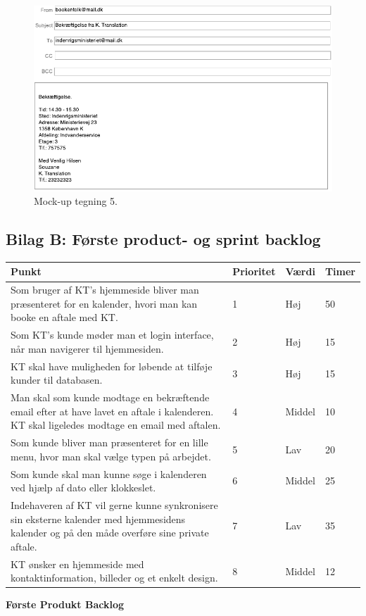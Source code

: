 \documentclass[12pt]{article}   %
\begin{document}
\newpage

\begin{figure}[!ht]
\begin{center}
\includegraphics{mock5.pdf}
\caption{Mock-up tegning 5.}
\end{center}
\end{figure}

\newpage

\subsection{Bilag B: Første product- og sprint backlog}

\begin{center}
	\begin{tabular}{|p{8cm}|l|l|l|}
		\hline
Punkt & Prioritet & Værdi & Timer \\ \hline
Som bruger af KT's hjemmeside bliver man præsenteret for en kalender, hvori man
kan booke en aftale med KT. & 1 & Høj &  50 \\ \hline
Som KT's kunde møder man et login interface, når man navigerer til hjemmesiden. & 2 &
Høj & 15  \\ \hline
KT skal have muligheden for løbende at tilføje kunder til databasen. & 3 & Høj
& 15 \\ \hline
Man skal som kunde modtage en bekræftende email efter at have lavet en aftale
i kalenderen. KT skal ligeledes modtage en email med aftalen. & 4 & Middel & 10  \\ \hline
Som kunde bliver man præsenteret for en lille menu, hvor man skal vælge typen
på arbejdet. & 5 & Lav & 20\\ \hline
Som kunde skal man kunne søge i kalenderen ved hjælp af dato eller klokkeslet.
& 6  & Middel &  25 \\ \hline
Indehaveren af KT vil gerne kunne synkronisere sin eksterne kalender med
hjemmesidens kalender og på den måde overføre sine private aftale. & 7 & Lav &
 35 \\ \hline
KT ønsker en hjemmeside med kontaktinformation, billeder og et enkelt design.
& 8 & Middel & 12 \\ \hline
\end{tabular}
\end{center}
\begin{center}\textbf{Første Produkt Backlog}
\end{center}
\vspace{0.5cm}
\end{document}
